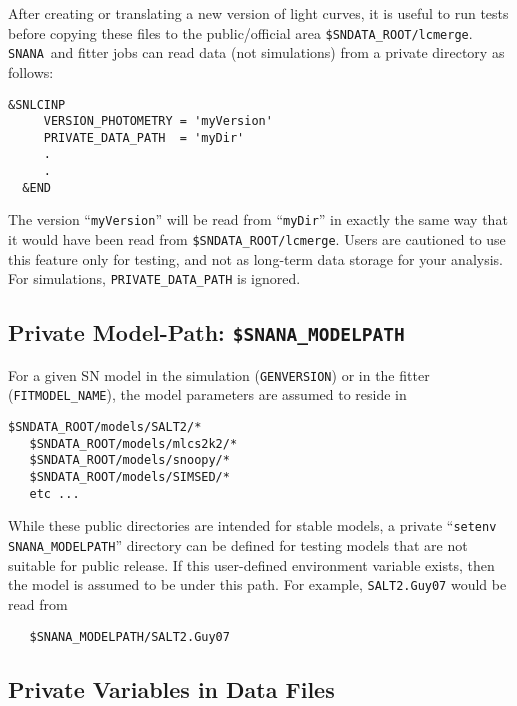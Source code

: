 \documentclass[12pt]{article}
\newcommand{\snana}{{\tt SNANA}}
\begin{document}
After creating or translating a new version of light curves,
it is useful to run tests before copying these files to 
the public/official area {\tt \$SNDATA\_ROOT/lcmerge}.
\snana\ and fitter jobs can read data (not simulations) 
from a private directory as follows:
%
\begin{Verbatim}[frame=single]
  &SNLCINP
     VERSION_PHOTOMETRY = 'myVersion'
     PRIVATE_DATA_PATH  = 'myDir'
     .
     .
  &END
\end{Verbatim}
%
The version ``{\tt myVersion}'' will be read from
``{\tt myDir}'' in exactly the same way that it would
have been read from {\tt \$SNDATA\_ROOT/lcmerge}.
Users are cautioned to use this feature only for
testing, and not as long-term data storage for
your analysis. For simulations, {\tt PRIVATE\_DATA\_PATH}
is ignored.

  \subsection{Private Model-Path: {\tt \$SNANA\_MODELPATH} }
  \label{subsec:private_modelpath}

For a given SN model in the simulation ({\tt GENVERSION})
or in the fitter ({\tt FITMODEL\_NAME}), 
the model parameters are assumed to reside in
%
\begin{Verbatim}[frame=single]
   $SNDATA_ROOT/models/SALT2/*
   $SNDATA_ROOT/models/mlcs2k2/*
   $SNDATA_ROOT/models/snoopy/*
   $SNDATA_ROOT/models/SIMSED/*
   etc ...   
\end{Verbatim}
%
While these public directories are intended for stable models,
a private ``{\tt setenv SNANA\_MODELPATH}'' directory can be 
defined for testing models that are not suitable for public release.
If this user-defined environment variable exists,
then the model is assumed to be under this path. 
For example, {\tt SALT2.Guy07} would be read from
\begin{verbatim}
   $SNANA_MODELPATH/SALT2.Guy07
\end{verbatim}



  \subsection{Private Variables in Data Files}
  \label{subsec:private_var}
\end{document}
